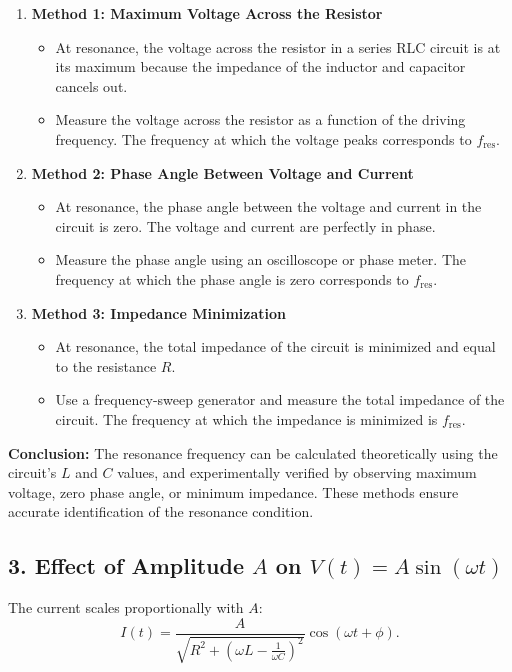 \documentclass[a4paper,11pt]{article}
\begin{document}
        \begin{enumerate}
            \item \textbf{Method 1: Maximum Voltage Across the Resistor}
            \begin{itemize}
                \item At resonance, the voltage across the resistor in a series RLC circuit is at its maximum because the impedance of the inductor and capacitor cancels out.
                \item Measure the voltage across the resistor as a function of the driving frequency. The frequency at which the voltage peaks corresponds to \( f_{\text{res}} \).
            \end{itemize}

            \item \textbf{Method 2: Phase Angle Between Voltage and Current}
            \begin{itemize}
                \item At resonance, the phase angle between the voltage and current in the circuit is zero. The voltage and current are perfectly in phase.
                \item Measure the phase angle using an oscilloscope or phase meter. The frequency at which the phase angle is zero corresponds to \( f_{\text{res}} \).
            \end{itemize}

            \item \textbf{Method 3: Impedance Minimization}
            \begin{itemize}
                \item At resonance, the total impedance of the circuit is minimized and equal to the resistance \( R \).
                \item Use a frequency-sweep generator and measure the total impedance of the circuit. The frequency at which the impedance is minimized is \( f_{\text{res}} \).
            \end{itemize}
        \end{enumerate}

        \textbf{Conclusion:}
        The resonance frequency can be calculated theoretically using the circuit's \( L \) and \( C \) values, and experimentally verified by observing maximum voltage, zero phase angle, or minimum impedance. These methods ensure accurate identification of the resonance condition.
        
\subsection*{3. Effect of Amplitude \(A\) on \(V(t) = A \sin(\omega t)\)}
The current scales proportionally with \(A\):
\[
I(t) = \frac{A}{\sqrt{R^2 + \left(\omega L - \frac{1}{\omega C}\right)^2}} \cos(\omega t + \phi).
\]
\end{document}
